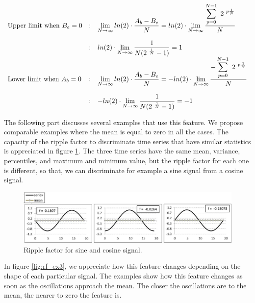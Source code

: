 \begin{equation}
\begin{array}{lcl}
\text{Upper limit when $B_e = 0$} &:& \mathlarger{\lim_{N\to\infty} ln(2) \cdot \dfrac{A_b - B_e }{N} 
                                = ln(2) \cdot \lim_{N\to\infty} \dfrac{ \mathlarger{\sum_{p=0}^{N-1} \ 2^{\ p \frac{1}{N}} }}{N}}\\ \\
                              &:& \mathlarger{ ln(2) \cdot \lim_{N\to\infty} \dfrac{1}{ N (2^{\ \frac{1}{N}}-1)} = 1 }  \\ 	
                              
\text{Lower limit when $A_b = 0$} &:& \mathlarger{\lim_{N\to\infty} ln(2) \cdot \dfrac{A_b - B_e }{N} 
                                = -ln(2) \cdot \lim_{N\to\infty} \dfrac{ \mathlarger{-\sum_{p=0}^{N-1} \ 2^{\ p \frac{1}{N}} }}{N}}\\ \\
                              &:& \mathlarger{-ln(2) \cdot \lim_{N\to\infty} \dfrac{1}{ N (2^{\ \frac{1}{N}}-1)} = -1 } 						
\end{array}
\label{limit_cal}
\end{equation}

The following part discusses several examples that use this feature. We propose comparable examples where the mean is equal to zero in all the cases. The capacity of the ripple factor to discriminate time series that have similar statistics is appreciated in figure \ref{fig:rf_ex2}. The three time series have the same mean, variance, percentiles, and maximum and minimum value, but the ripple factor for each one is different, so that, we can discriminate for example a sine signal from a cosine signal. 

\begin{figure}[h!]
  \vspace{0.5em} %
  \includegraphics[scale=0.7]{Figures/Example_2_rf.jpg}
  \caption{Ripple factor for sine and cosine signal.}
  \label{fig:rf_ex2}
\end{figure}

In figure \ref{fig:rf_ex3}, we appreciate how this feature changes depending on the shape of each particular signal. The examples show how this feature changes as soon as the oscillations approach the mean. The closer the oscillations are to the mean, the nearer to zero the feature is. \\

